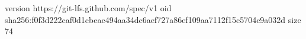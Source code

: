 version https://git-lfs.github.com/spec/v1
oid sha256:f0f3d222caf0d1cbeac494aa34dc6aef727a86ef109aa7112f15c5704c9a032d
size 74
